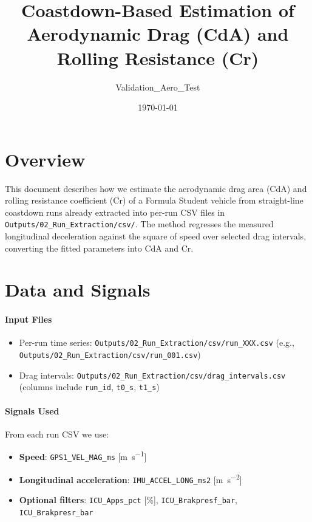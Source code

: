 \documentclass[11pt,a4paper]{article}
\title{Coastdown-Based Estimation of Aerodynamic Drag (CdA) and Rolling Resistance (Cr)}
\author{Validation\_Aero\_Test}
\date{\today}
\begin{document}
\maketitle

\section{Overview}
This document describes how we estimate the aerodynamic drag area (CdA) and rolling resistance coefficient (Cr) of a Formula Student vehicle from straight-line coastdown runs already extracted into per-run CSV files in \texttt{Outputs/02\_Run\_Extraction/csv/}. The method regresses the measured longitudinal deceleration against the square of speed over selected drag intervals, converting the fitted parameters into CdA and Cr.

\section{Data and Signals}
\paragraph{Input Files}
\begin{itemize}
  \item Per-run time series: \texttt{Outputs/02\_Run\_Extraction/csv/run\_XXX.csv} (e.g., \texttt{Outputs/02\_Run\_Extraction/csv/run\_001.csv})
  \item Drag intervals: \texttt{Outputs/02\_Run\_Extraction/csv/drag\_intervals.csv} (columns include \texttt{run\_id}, \texttt{t0\_s}, \texttt{t1\_s})
\end{itemize}

\paragraph{Signals Used}
From each run CSV we use:
\begin{itemize}
  \item \textbf{Speed}: \texttt{GPS1\_VEL\_MAG\_ms} [\si{\meter\per\second}]
  \item \textbf{Longitudinal acceleration}: \texttt{IMU\_ACCEL\_LONG\_ms2} [\si{\meter\per\second\squared}]
  \item \textbf{Optional filters}: \texttt{ICU\_Apps\_pct} [\%], \texttt{ICU\_Brakpresf\_bar}, \texttt{ICU\_Brakpresr\_bar}
\end{itemize}
\end{document}

